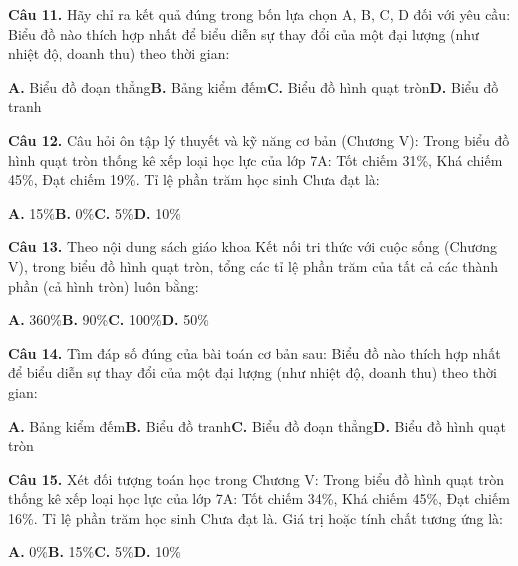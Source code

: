 \documentclass[11pt,a4paper]{article}
\begin{document}
\textbf{\color{primary} Câu 11.} Hãy chỉ ra kết quả đúng trong bốn lựa chọn A, B, C, D đối với yêu cầu: Biểu đồ nào thích hợp nhất để biểu diễn sự thay đổi của một đại lượng (như nhiệt độ, doanh thu) theo thời gian:\par
\hspace*{1.5em}\textbf{A.} Biểu đồ đoạn thẳng\quad\quad \textbf{B.} Bảng kiểm đếm\quad\quad \textbf{C.} Biểu đồ hình quạt tròn\quad\quad \textbf{D.} Biểu đồ tranh\par\vspace{2pt}
\textbf{\color{primary} Câu 12.} Câu hỏi ôn tập lý thuyết và kỹ năng cơ bản (Chương V): Trong biểu đồ hình quạt tròn thống kê xếp loại học lực của lớp 7A: Tốt chiếm 31\%, Khá chiếm 45\%, Đạt chiếm 19\%. Tỉ lệ phần trăm học sinh Chưa đạt là:\par
\hspace*{1.5em}\textbf{A.} 15\%\quad\quad \textbf{B.} 0\%\quad\quad \textbf{C.} 5\%\quad\quad \textbf{D.} 10\%\par\vspace{2pt}
\textbf{\color{primary} Câu 13.} Theo nội dung sách giáo khoa Kết nối tri thức với cuộc sống (Chương V), trong biểu đồ hình quạt tròn, tổng các tỉ lệ phần trăm của tất cả các thành phần (cả hình tròn) luôn bằng:\par
\hspace*{1.5em}\textbf{A.} 360\%\quad\quad \textbf{B.} 90\%\quad\quad \textbf{C.} 100\%\quad\quad \textbf{D.} 50\%\par\vspace{2pt}
\textbf{\color{primary} Câu 14.} Tìm đáp số đúng của bài toán cơ bản sau: Biểu đồ nào thích hợp nhất để biểu diễn sự thay đổi của một đại lượng (như nhiệt độ, doanh thu) theo thời gian:\par
\hspace*{1.5em}\textbf{A.} Bảng kiểm đếm\quad\quad \textbf{B.} Biểu đồ tranh\quad\quad \textbf{C.} Biểu đồ đoạn thẳng\quad\quad \textbf{D.} Biểu đồ hình quạt tròn\par\vspace{2pt}
\textbf{\color{primary} Câu 15.} Xét đối tượng toán học trong Chương V: Trong biểu đồ hình quạt tròn thống kê xếp loại học lực của lớp 7A: Tốt chiếm 34\%, Khá chiếm 45\%, Đạt chiếm 16\%. Tỉ lệ phần trăm học sinh Chưa đạt là. Giá trị hoặc tính chất tương ứng là:\par
\hspace*{1.5em}\textbf{A.} 0\%\quad\quad \textbf{B.} 15\%\quad\quad \textbf{C.} 5\%\quad\quad \textbf{D.} 10\%\par\vspace{2pt}
\end{document}
